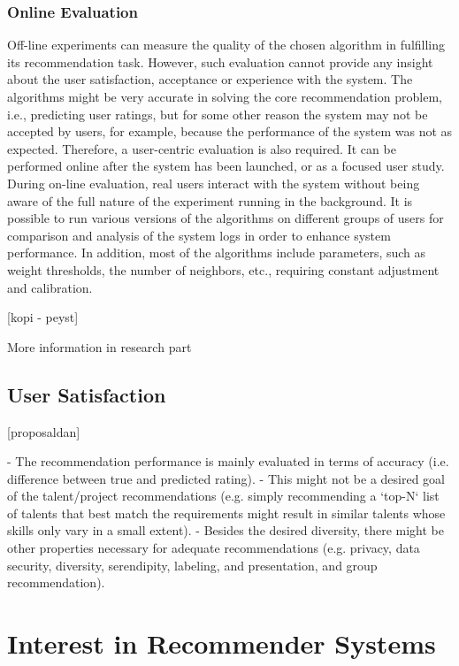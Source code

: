 \subsubsection{Online Evaluation}
Off-line experiments can measure the quality of the chosen algorithm in fulfilling its recommendation task. However, such evaluation cannot provide any insight about the user satisfaction, acceptance or experience with the system. The algorithms might be very accurate in solving the core recommendation problem, i.e., predicting user ratings, but for some other reason the system may not be accepted by users, for example, because the performance of the system was not as expected.
Therefore, a user-centric evaluation is also required. It can be performed online after the system has been launched, or as a focused user study. During on-line evaluation, real users interact with the system without being aware of the full nature of the experiment running in the background. It is possible to run various versions of the algorithms on different groups of users for comparison and analysis of the system logs in order to enhance system performance. In addition, most of the algorithms include parameters, such as weight thresholds, the number of neighbors, etc., requiring constant adjustment and calibration.

[kopi - peyst]

More information in research part

\subsection{User Satisfaction}

[proposaldan]

- The recommendation performance is mainly evaluated in terms of accuracy (i.e. difference between true and predicted rating).
- This might not be a desired goal of the talent/project recommendations (e.g. simply recommending a `top-N` list of talents that best match the requirements might result in similar talents whose skills only vary in a small extent).
- Besides the desired diversity, there might be other properties necessary for adequate recommendations (e.g. privacy, data security, diversity, serendipity, labeling, and presentation, and group recommendation).

\section{Interest in Recommender Systems}

